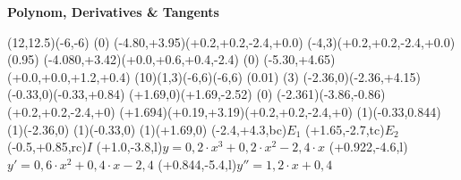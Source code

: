 



\begin{center}
{\Huge\bf{Polynom, Derivatives \& Tangents}}
\bigskip

\begin{lapdf}(12,12.5)(-6,-6)
 \Red
 \Dash(0)
 \Polynom(-4.80,+3.95)(+0.2,+0.2,-2.4,+0.0) \Stroke
 \Polynom(-4,3)(+0.2,+0.2,-2.4,+0.0) \Gfill(0.95)
 \Blue
 \Polynom(-4.080,+3.42)(+0.0,+0.6,+0.4,-2.4) \Stroke
 \Green
 \Dash(0)
 \Polynom(-5.30,+4.65)(+0.0,+0.0,+1.2,+0.4) \Stroke
 \Lingrid(10)(1,3)(-6,6)(-6,6)
 \Setwidth(0.01)
 \Black
 \Dash(3)
 \Line(-2.36,0)(-2.36,+4.15) \Stroke
 \Line(-0.33,0)(-0.33,+0.84) \Stroke
 \Line(+1.69,0)(+1.69,-2.52) \Stroke
 \Dash(0)
 \Tangent(-2.361)(-3.86,-0.86)(+0.2,+0.2,-2.4,+0) \Stroke
 \Tangent(+1.694)(+0.19,+3.19)(+0.2,+0.2,-2.4,+0) \Stroke
 \Point(1)(-0.33,0.844)
 \Point(1)(-2.36,0)
 \Point(1)(-0.33,0)
 \Point(1)(+1.69,0)
 \Text(-2.4,+4.3,bc){$E_1$}
 \Text(+1.65,-2.7,tc){$E_2$}
 \Text(-0.5,+0.85,rc){$I$}
 \Text(+1.0,-3.8,l){$y=0,2\cdot x^3+0,2\cdot x^2-2,4\cdot x$}
 \Text(+0.922,-4.6,l){$y'=0,6\cdot x^2+0,4\cdot x-2,4$}
 \Text(+0.844,-5.4,l){$y''=1,2\cdot x+0,4$}
\end{lapdf}

\end{center}

